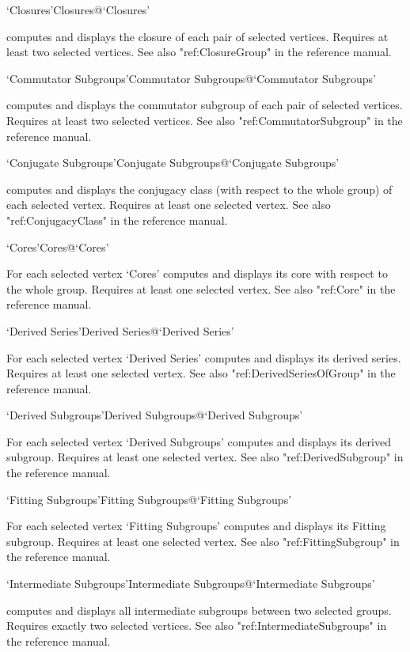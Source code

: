 \>`Closures'{Closures}@{`Closures'}

computes and displays the closure of each pair of selected vertices.
Requires at least two selected vertices. See also "ref:ClosureGroup" in the
{\GAP} reference manual.

\>`Commutator Subgroups'{Commutator Subgroups}@{`Commutator Subgroups'}

computes and displays  the commutator  subgroup of each pair of selected
vertices.    Requires  at  least    two   selected  vertices. See    also
"ref:CommutatorSubgroup" in the {\GAP}
reference manual.

\>`Conjugate Subgroups'{Conjugate Subgroups}@{`Conjugate Subgroups'}

computes and displays the conjugacy  class (with  respect to the  whole
group) of each  selected vertex.  Requires  at least one selected vertex.
See also "ref:ConjugacyClass" in the {\GAP}
reference manual.

\>`Cores'{Cores}@{`Cores'}

For each selected vertex `Cores' computes and displays its core with
respect to the whole group.  Requires at least one selected vertex. See
also "ref:Core" in the {\GAP}
reference manual.

\>`Derived Series'{Derived Series}@{`Derived Series'}

For   each  selected vertex  `Derived  Series'  computes and displays its
derived series.   Requires  at   least  one selected vertex.    See  also
"ref:DerivedSeriesOfGroup" in the {\GAP}
reference manual.

\>`Derived Subgroups'{Derived Subgroups}@{`Derived Subgroups'}

For each selected vertex `Derived Subgroups' computes and displays its
derived subgroup.  Requires at least one selected vertex.  See also
"ref:DerivedSubgroup" in the {\GAP}
reference manual.

\>`Fitting Subgroups'{Fitting Subgroups}@{`Fitting Subgroups'}

For each selected vertex `Fitting Subgroups' computes and displays its
Fitting subgroup.  Requires at least one selected vertex.  See also
"ref:FittingSubgroup" in the {\GAP}
reference manual.

\>`Intermediate Subgroups'{Intermediate Subgroups}@{`Intermediate Subgroups'}

computes and displays all intermediate subgroups between two selected
groups. Requires exactly two selected vertices. See also
"ref:IntermediateSubgroups" in the {\GAP}
reference manual. 

